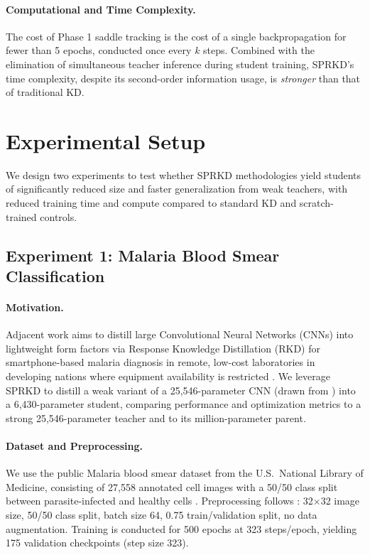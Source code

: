 \documentclass[letterpaper]{article}
\begin{document}
\paragraph{Computational and Time Complexity.}
The cost of Phase 1 saddle tracking is the cost of a single backpropagation for fewer than 5 epochs, conducted once every $k$ steps. Combined with the elimination of simultaneous teacher inference during student training, SPRKD's time complexity, despite its second-order information usage, is \emph{stronger} than that of traditional KD.

\section{Experimental Setup}

We design two experiments to test whether SPRKD methodologies yield students of significantly reduced size and faster generalization from weak teachers, with reduced training time and compute compared to standard KD and scratch-trained controls.

\subsection{Experiment 1: Malaria Blood Smear Classification}

\paragraph{Motivation.}
Adjacent work aims to distill large Convolutional Neural Networks (CNNs) into lightweight form factors via Response Knowledge Distillation (RKD) for smartphone-based malaria diagnosis in remote, low-cost laboratories in developing nations where equipment availability is restricted \citep{fuhad2020malaria}. We leverage SPRKD to distill a weak variant of a 25{,}546-parameter CNN (drawn from \citet{fuhad2020malaria}) into a 6{,}430-parameter student, comparing performance and optimization metrics to a strong 25{,}546-parameter teacher and to its million-parameter parent.

\paragraph{Dataset and Preprocessing.}
We use the public Malaria blood smear dataset from the U.S.~National Library of Medicine, consisting of 27{,}558 annotated cell images with a 50/50 class split between parasite-infected and healthy cells \citep{nlmmalaria}. Preprocessing follows \citet{fuhad2020malaria}: 32$\times$32 image size, 50/50 class split, batch size 64, 0.75 train/validation split, no data augmentation. Training is conducted for 500 epochs at 323 steps/epoch, yielding 175 validation checkpoints (step size 323).
\end{document}
